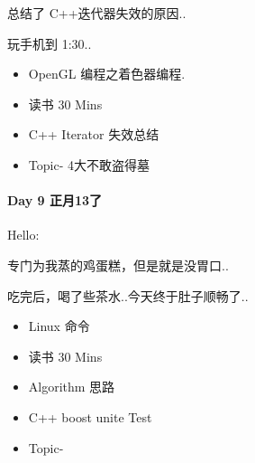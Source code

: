 \documentclass[UTF8,a4paper,8pt]{ctexart}
\begin{document}
		 总结了 C++迭代器失效的原因..
		 
		 玩手机到 1:30..
	 	 \begin{itemize}
	 	 	\item  \makebox[0pt][l]{$\square$}\raisebox{.15ex}{\hspace{0.1em}$\checkmark$} OpenGL 编程之着色器编程.
	 	 	
	 	 	\item  \makebox[0pt][l]{$\square$}\raisebox{.15ex}{\hspace{0.1em}$\checkmark$} 读书  30 Mins		 	 
	 	 	\item  \makebox[0pt][l]{$\square$}\raisebox{.15ex}{\hspace{0.1em}$\checkmark$} C++  Iterator 失效总结
	 	 	
	 	 	\item  \makebox[0pt][l]{$\square$}\raisebox{.15ex}{\hspace{0.1em}$\checkmark$} Topic- 4大不敢盗得墓
	 	 \end{itemize}
 	 \paragraph{Day 9   正月13了     }Hello:
 	 
	 	 专门为我蒸的鸡蛋糕，但是就是没胃口..
	 	 
	 	 吃完后，喝了些茶水..今天终于肚子顺畅了..
	 	 
	 	 \begin{itemize}
	 	 	\item  \makebox[0pt][l]{$\square$}\raisebox{.15ex}{\hspace{0.1em}$\checkmark$} Linux 命令
	 	 	
	 	 	\item  \makebox[0pt][l]{$\square$}\raisebox{.15ex}{\hspace{0.1em}$\checkmark$} 读书  30 Mins		 	 
	 	 	\item  \makebox[0pt][l]{$\square$}\raisebox{.15ex}{\hspace{0.1em}$\checkmark$} Algorithm 思路
	 	 	\item  \makebox[0pt][l]{$\square$}\raisebox{.15ex}{\hspace{0.1em}$\checkmark$} C++ boost unite Test
	 	 	
	 	 	\item  \makebox[0pt][l]{$\square$}\raisebox{.15ex}{\hspace{0.1em}$\checkmark$} Topic- 
	 	 \end{itemize}
\end{document}
